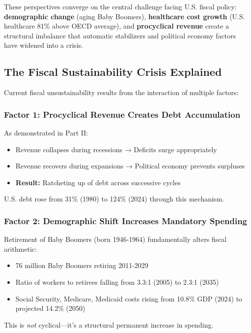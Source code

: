 \documentclass[12pt,letterpaper]{article}
\begin{document}
These perspectives converge on the central challenge facing U.S. fiscal policy: \textbf{demographic change} (aging Baby Boomers), \textbf{healthcare cost growth} (U.S. healthcare 81\% above OECD average), and \textbf{procyclical revenue} create a structural imbalance that automatic stabilizers and political economy factors have widened into a crisis.

\subsection{The Fiscal Sustainability Crisis Explained}

Current fiscal unsustainability results from the interaction of multiple factors:

\subsubsection{Factor 1: Procyclical Revenue Creates Debt Accumulation}

As demonstrated in Part II:
\begin{itemize}
    \item Revenue collapses during recessions → Deficits surge appropriately
    \item Revenue recovers during expansions → Political economy prevents surpluses
    \item \textbf{Result:} Ratcheting up of debt across successive cycles
\end{itemize}

U.S. debt rose from 31\% (1980) to 124\% (2024) through this mechanism.

\subsubsection{Factor 2: Demographic Shift Increases Mandatory Spending}

Retirement of Baby Boomers (born 1946-1964) fundamentally alters fiscal arithmetic:
\begin{itemize}
    \item 76 million Baby Boomers retiring 2011-2029
    \item Ratio of workers to retirees falling from 3.3:1 (2005) to 2.3:1 (2035)
    \item Social Security, Medicare, Medicaid costs rising from 10.8\% GDP (2024) to projected 14.2\% (2050)
\end{itemize}

This is \textit{not} cyclical—it's a structural permanent increase in spending.
\end{document}
